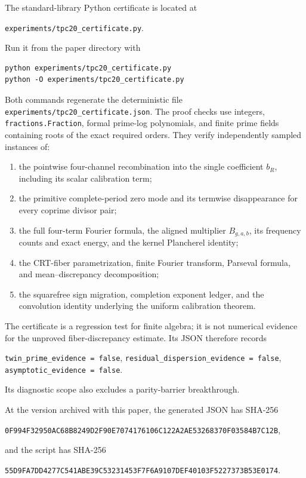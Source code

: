 The standard-library Python certificate is located at
\begin{center}
 \texttt{experiments/tpc20\_certificate.py}.
\end{center}
Run it from the paper directory with
\begin{verbatim}
python experiments/tpc20_certificate.py
python -O experiments/tpc20_certificate.py
\end{verbatim}
Both commands regenerate the deterministic file
\texttt{experiments/tpc20\_certificate.json}.  The proof checks use
integers, \texttt{fractions.Fraction}, formal prime-log polynomials, and
finite prime fields containing roots of the exact required orders.
They verify independently sampled instances of:
\begin{enumerate}[label=\textnormal{(\roman*)}]
 \item the pointwise four-channel recombination into the single
 coefficient \(b_R\), including its scalar calibration term;
 \item the primitive complete-period zero mode and its termwise
 disappearance for every coprime divisor pair;
 \item the full four-term Fourier formula, the aligned multiplier
 \(B_{g,a,b}\), its frequency counts and exact energy, and the kernel
 Plancherel identity;
 \item the CRT-fiber parametrization, finite Fourier transform,
 Parseval formula, and mean--discrepancy decomposition;
 \item the squarefree sign migration, completion exponent ledger, and
 the convolution identity underlying the uniform calibration theorem.
\end{enumerate}
The certificate is a regression test for finite algebra; it is not
numerical evidence for the unproved fiber-discrepancy estimate.  Its
JSON therefore records
\begin{center}
 \texttt{twin\_prime\_evidence = false},\qquad
 \texttt{residual\_dispersion\_evidence = false},\\
 \texttt{asymptotic\_evidence = false}.
\end{center}
Its diagnostic scope also excludes a parity-barrier breakthrough.

At the version archived with this paper, the generated JSON has
SHA-256
\begin{center}
 \texttt{0F994F32950AC68B8249D2F90E7074176106C122A2AE53268370F03584B7C12B},
\end{center}
and the script has SHA-256
\begin{center}
 \texttt{55D9FA7DD4277C541ABE39C53231453F7F6A9107DEF40103F5227373B53E0174}.
\end{center}

